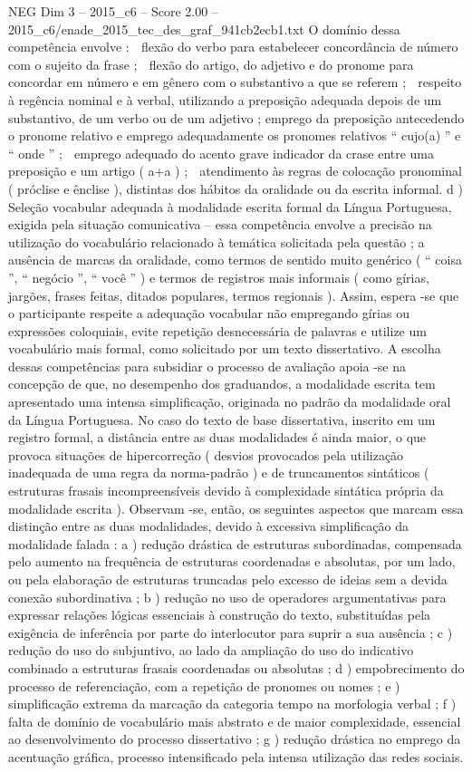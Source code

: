 \begin{textsample}{NEG Dim 3 – 2015\_c6 – Score 2.00 – 2015\_c6/enade\_2015\_tec\_des\_graf\_941cb2ecb1.txt}
O domínio dessa competência envolve :  flexão do verbo para estabelecer concordância de número com o sujeito da frase ;  flexão do artigo, do adjetivo e do pronome para concordar em número e em gênero com o substantivo a que se referem ;  respeito à regência nominal e à verbal, utilizando a preposição adequada depois de um substantivo, de um verbo ou de um adjetivo ; emprego da preposição antecedendo o pronome relativo e emprego adequadamente os pronomes relativos “ cujo(a) ” e “ onde ” ;  emprego adequado do acento grave indicador da crase entre uma preposição e um artigo ( a+a ) ;  atendimento às regras de colocação pronominal ( próclise e ênclise ), distintas dos hábitos da oralidade ou da escrita informal. d ) Seleção vocabular adequada à modalidade escrita formal da Língua Portuguesa, exigida pela situação comunicativa – essa competência envolve a precisão na utilização do vocabulário relacionado à temática solicitada pela questão ; a ausência de marcas da oralidade, como termos de sentido muito genérico ( “ coisa ”, “ negócio ”, “ você ” ) e termos de registros mais informais ( como gírias, jargões, frases feitas, ditados populares, termos regionais ).
Assim, espera -se que o participante respeite a adequação vocabular não empregando gírias ou expressões coloquiais, evite repetição desnecessária de palavras e utilize um vocabulário mais formal, como solicitado por um texto dissertativo.
A escolha dessas competências para subsidiar o processo de avaliação apoia -se na concepção de que, no desempenho dos graduandos, a modalidade escrita tem apresentado uma intensa simplificação, originada no padrão da modalidade oral da Língua Portuguesa.
No caso do texto de base dissertativa, inscrito em um registro formal, a distância entre as duas modalidades é ainda maior, o que provoca situações de hipercorreção ( desvios provocados pela utilização inadequada de uma regra da norma-padrão ) e de truncamentos sintáticos ( estruturas frasais incompreensíveis devido à complexidade sintática própria da modalidade escrita ).
Observam -se, então, os seguintes aspectos que marcam essa distinção entre as duas modalidades, devido à excessiva simplificação da modalidade falada : a ) redução drástica de estruturas subordinadas, compensada pelo aumento na frequência de estruturas coordenadas e absolutas, por um lado, ou pela elaboração de estruturas truncadas pelo excesso de ideias sem a devida conexão subordinativa ; b ) redução no uso de operadores argumentativas para expressar relações lógicas essenciais à construção do texto, substituídas pela exigência de inferência por parte do interlocutor para suprir a sua ausência ; c ) redução do uso do subjuntivo, ao lado da ampliação do uso do indicativo combinado a estruturas frasais coordenadas ou absolutas ; d ) empobrecimento do processo de referenciação, com a repetição de pronomes ou nomes ; e ) simplificação extrema da marcação da categoria tempo na morfologia verbal ; f ) falta de domínio de vocabulário mais abstrato e de maior complexidade, essencial ao desenvolvimento do processo dissertativo ; g ) redução drástica no emprego da acentuação gráfica, processo intensificado pela intensa utilização das redes sociais.

\end{textsample}
